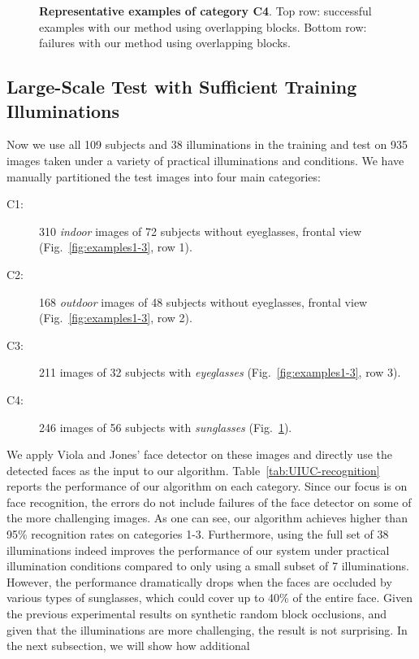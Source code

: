 \documentclass[10pt,journal,letterpaper,compsoc]{IEEEtran} %
\begin{document}
\begin{figure}[t]
\begin{tabular}{@{}c@{}c@{}c@{}c@{}c@{}c@{}}
\end{tabular}
 \caption{{\bf Representative examples of category C4}. Top row: successful examples with our method using overlapping blocks. Bottom row: failures with our method using overlapping blocks.}\label{fig:examples4}
\vspace{-.55in}
\end{figure}

\subsection{Large-Scale Test with Sufficient Training
Illuminations} Now we use all 109 subjects and 38 illuminations
in the training and test on 935 images taken under a variety of
practical illuminations and conditions. We have manually partitioned the test images into four main
categories:
\begin{description}
\item[C1:] 310 \emph{indoor} images of 72 subjects without
    eyeglasses, frontal view
    (Fig.~\ref{fig:examples1-3}, row 1).
\item[C2:] 168 \emph{outdoor} images of 48 subjects without
    eyeglasses, frontal view
    (Fig.~\ref{fig:examples1-3}, row 2).
\item[C3:] 211 images of 32 subjects with \emph{eyeglasses}
    (Fig.~\ref{fig:examples1-3}, row 3).
\item[C4:] 246 images of 56 subjects with \emph{sunglasses}
    (Fig.~\ref{fig:examples4}).
\end{description}
We apply Viola and Jones' face detector on these images and
directly use the detected faces as the input to our algorithm.
Table~\ref{tab:UIUC-recognition} reports the performance of our
algorithm on each category.
Since our focus is on face
recognition, the errors do not include failures of the face
detector on some of the more challenging images.
As one can see, our algorithm achieves higher than 95\%
recognition rates on categories 1-3. Furthermore, using the
full set of 38 illuminations indeed improves the performance of
our system under practical illumination conditions compared to
only using a small subset of 7 illuminations. However, the
performance dramatically drops when the faces are occluded by
various types of sunglasses, which could cover up to 40\% of
the entire face. Given the previous experimental results on
synthetic random block occlusions, and given that the
illuminations are more challenging, the result is not
surprising. In the next subsection, we will show how additional
\end{document}
